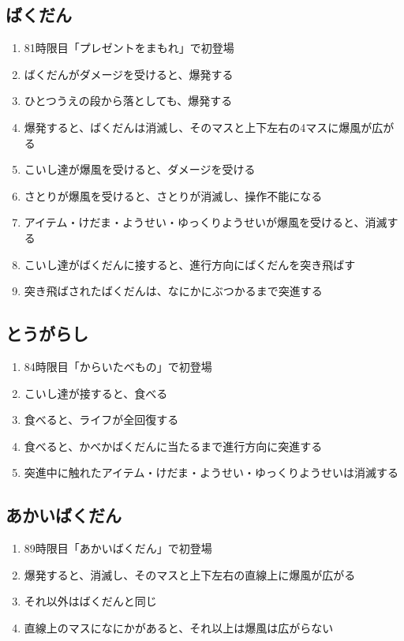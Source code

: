 \subsection{ばくだん}
\begin{enumerate}[label={\sarrow}]
\item 81時限目「プレゼントをまもれ」で初登場
\item ばくだんがダメージを受けると、爆発する
\item ひとつうえの段から落としても、爆発する
\item 爆発すると、ばくだんは消滅し、そのマスと上下左右の4マスに爆風が広がる
\item こいし達が爆風を受けると、ダメージを受ける
\item さとりが爆風を受けると、さとりが消滅し、操作不能になる
\item アイテム・けだま・ようせい・ゆっくりようせいが爆風を受けると、消滅する
\item こいし達がばくだんに接すると、進行方向にばくだんを突き飛ばす
\item 突き飛ばされたばくだんは、なにかにぶつかるまで突進する
\end{enumerate}


\subsection{とうがらし}
\begin{enumerate}[label={\sarrow}]
\item 84時限目「からいたべもの」で初登場
\item こいし達が接すると、食べる
\item 食べると、ライフが全回復する
\item 食べると、かべかばくだんに当たるまで進行方向に突進する
\item 突進中に触れたアイテム・けだま・ようせい・ゆっくりようせいは消滅する
\end{enumerate}


\subsection{あかいばくだん}
\begin{enumerate}[label={\sarrow}]
\item 89時限目「あかいばくだん」で初登場
\item 爆発すると、消滅し、そのマスと上下左右の直線上に爆風が広がる
\item それ以外はばくだんと同じ
\item 直線上のマスになにかがあると、それ以上は爆風は広がらない
\end{enumerate}



